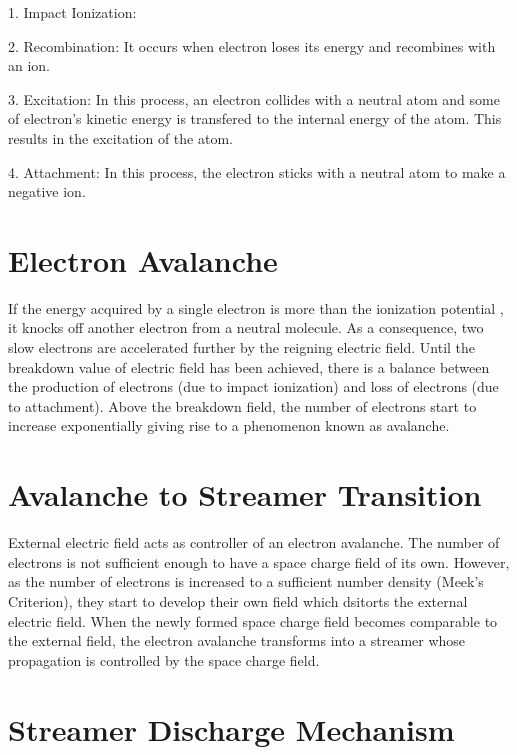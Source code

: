 1. Impact Ionization:

2. Recombination:
           It occurs when electron loses its energy and recombines with an ion.

3. Excitation:
           In this process, an electron collides with a neutral atom and some of electron's kinetic energy is transfered to the internal energy of the atom. This results in the excitation of the atom.


4. Attachment:
            In this process, the electron sticks with a neutral atom to make a negative ion.


\section{Electron Avalanche}

If the energy acquired by a single electron is more than the ionization potential , it knocks off another electron from a neutral molecule. As a consequence, two slow electrons are accelerated further by the reigning electric field. Until the breakdown value of electric field has been achieved, there is a balance between the production of electrons (due to impact ionization) and loss of electrons (due to attachment). Above the breakdown field, the number of electrons start to increase exponentially giving rise to a phenomenon known as avalanche.

\section{Avalanche to Streamer Transition}
External electric field acts as controller of an electron avalanche. The number of electrons is not sufficient enough to have a space charge field of its own. However, as the number of electrons is increased to a sufficient number density (Meek's Criterion), they start to develop their own field which dsitorts the external electric field. When the newly formed space charge field becomes comparable to the external field, the electron avalanche transforms into a streamer whose propagation is controlled by the space charge field. 

\section{Streamer Discharge Mechanism}

